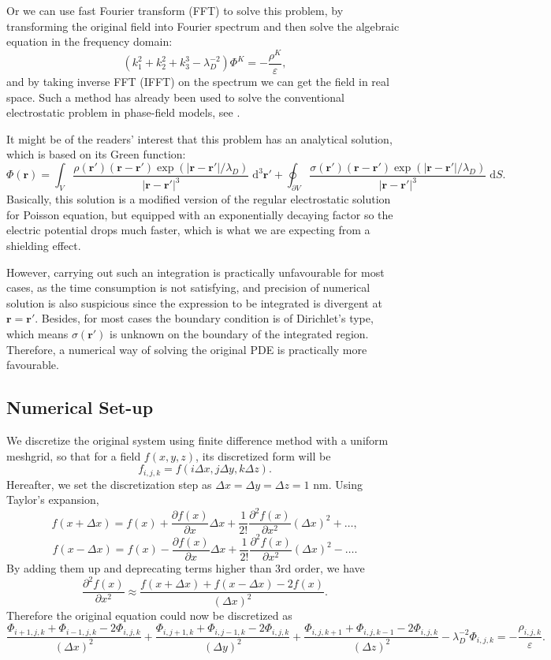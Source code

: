\documentclass{article}
\begin{document}
\begin{spacing}{1.1}
Or we can use fast Fourier transform (FFT) to solve this problem, by transforming the original field into Fourier spectrum and then solve the algebraic equation in the frequency domain:
\[(k_1^2+k_2^2+k_3^3-\lambda_D^{-2})\Phi^K=-\frac{\rho^K}{\varepsilon},\]
and by taking inverse FFT (IFFT) on the spectrum we can get the field in real space. Such a method has already been used to solve the conventional electrostatic problem in phase-field models, see \citep{li2002}.

It might be of the readers' interest that this problem has an analytical solution, which is based on its Green function:
\[ \Phi(\mathbf{r}) =
\int _V \frac{\rho(\mathbf{r'}) (\mathbf{r} - \mathbf{r'}) \exp(|\mathbf{r} - \mathbf{r'}| / \lambda_D)}{|\mathbf{r} - \mathbf{r'}|^3} \;\mathrm{d}^3 \mathbf{r'} +
\oint _{\partial V} \frac{\sigma(\mathbf{r'}) (\mathbf{r} - \mathbf{r'}) \exp(|\mathbf{r} - \mathbf{r'}| / \lambda_D)}{|\mathbf{r} - \mathbf{r'}|^3} \;\mathrm{d} S.\]
Basically, this solution is a modified version of the regular electrostatic solution for Poisson equation, but equipped with an exponentially decaying factor so the electric potential drops much faster, which is what we are expecting from a shielding effect.

However, carrying out such an integration is practically unfavourable for most cases, as the time consumption is not satisfying, and precision of numerical solution is also suspicious since the expression to be integrated is divergent at $\mathbf{r} = \mathbf{r'}$. Besides, for most cases the boundary condition is of Dirichlet's type, which means $\sigma(\mathbf{r'})$ is unknown on the boundary of the integrated region. Therefore, a numerical way of solving the original PDE is practically more favourable.

\subsection{Numerical Set-up}

We discretize the original system using finite difference method with a uniform meshgrid, so that for a field $f(x,y,z)$, its discretized form will be
\[f_{i,j,k}=f(i\Delta x, j\Delta y, k\Delta z).\]
Hereafter, we set the discretization step as $\Delta x = \Delta y = \Delta z = 1$ nm.
Using Taylor's expansion,
\[f(x+\Delta x) = f(x)+\frac{\partial f(x)}{\partial x}\Delta x+\frac{1}{2!}\frac{\partial ^2 f(x)}{\partial x^2} (\Delta x)^2+\dots ,\]
\[f(x-\Delta x) = f(x)-\frac{\partial f(x)}{\partial x}\Delta x+\frac{1}{2!}\frac{\partial ^2 f(x)}{\partial x^2} (\Delta x)^2-\dots .\]
By adding them up and deprecating terms higher than 3rd order, we have
\[\frac{\partial^2 f(x)}{\partial x^2}\approx\frac{f(x+\Delta x)+f(x-\Delta x)-2f(x)}{(\Delta x)^2}.\]
Therefore the original equation could now be discretized as
\[\frac{\Phi_{i+1,j,k}+\Phi_{i-1,j,k}-2\Phi_{i,j,k}}{(\Delta x)^2}+
\frac{\Phi_{i,j+1,k}+\Phi_{i,j-1,k}-2\Phi_{i,j,k}}{(\Delta y)^2}+
\frac{\Phi_{i,j,k+1}+\Phi_{i,j,k-1}-2\Phi_{i,j,k}}{(\Delta z)^2}-
\lambda_D^{-2}\Phi_{i,j,k}
=-\frac{\rho_{i,j,k}}{\varepsilon}.\]


\end{spacing}
\end{document}
